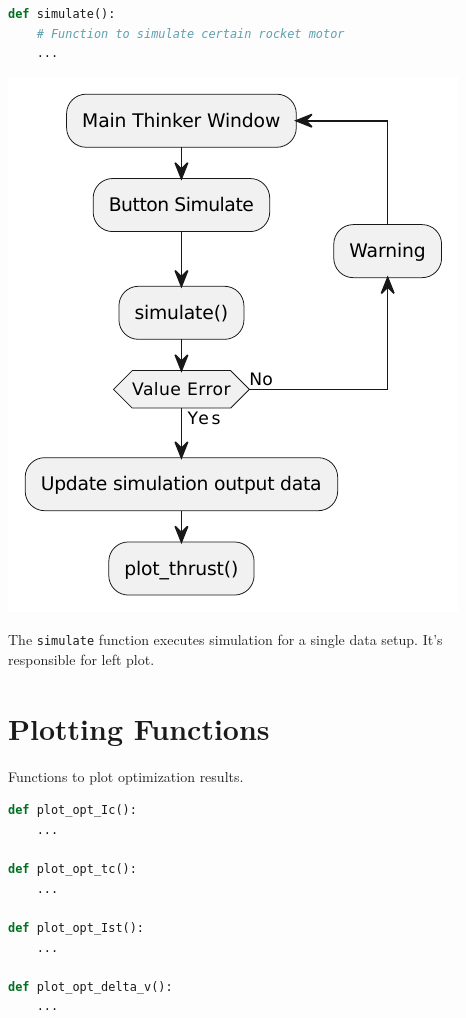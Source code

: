 \documentclass{report}
\begin{document}
\begin{lstlisting}[language=Python]
def simulate():
    # Function to simulate certain rocket motor
    ...
\end{lstlisting}
\begin{center}
\includegraphics[scale=1]{simulate}
\end{center}

The \texttt{simulate} function executes simulation for a single data setup. It's responsible for left plot.


\section{Plotting Functions}

Functions to plot optimization results.

\begin{lstlisting}[language=Python]
def plot_opt_Ic():
    ...

def plot_opt_tc():
    ...

def plot_opt_Ist():
    ...

def plot_opt_delta_v():
    ...
\end{lstlisting}
\end{document}

